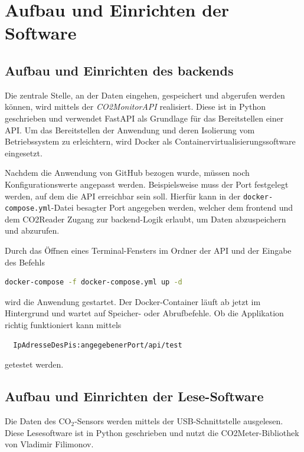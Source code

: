 \documentclass[a4paper,
    12pt,
    headings=small,
    ngerman,
    listof=totoc,
    numbers=noenddot]{scrreprt}[2021/11/13]
\begin{document}
\section{Aufbau und Einrichten der Software}

\subsection{Aufbau und Einrichten des \gls{backend}s}

Die zentrale Stelle, an der Daten eingehen, gespeichert und abgerufen werden können, wird mittels der \textit{CO2MonitorAPI} realisiert. Diese ist in \gls{Python} geschrieben und verwendet FastAPI als Grundlage für das Bereitstellen einer API. Um das Bereitstellen der Anwendung und deren  Isolierung vom Betriebssystem zu erleichtern, wird \gls{Docker} als Containervirtualisierungssoftware eingesetzt.

Nachdem die Anwendung von GitHub bezogen wurde, müssen noch Konfigurationswerte angepasst werden. Beispielsweise muss der Port festgelegt werden, auf dem die \ac{API} erreichbar sein soll. Hierfür kann in der \texttt{docker-compose.yml}-Datei besagter Port angegeben werden, welcher dem \gls{frontend} und dem CO2Reader Zugang zur \gls{backend}-Logik erlaubt, um Daten abzuspeichern und abzurufen.

Durch das Öffnen eines Terminal-Fensters im Ordner der \ac{API} und der Eingabe des Befehls

\begin{lstlisting}[language=Bash]
  docker-compose -f docker-compose.yml up -d
\end{lstlisting}

wird die Anwendung gestartet. Der \gls{Docker}-Container läuft ab jetzt im Hintergrund und wartet auf Speicher- oder Abrufbefehle. Ob die Applikation richtig funktioniert kann mittels

\begin{lstlisting}
  IpAdresseDesPis:angegebenerPort/api/test
\end{lstlisting}

getestet werden.


\subsection{Aufbau und Einrichten der Lese-Software}

Die Daten des CO$_2$-Sensors werden mittels der USB-Schnittstelle ausgelesen. Diese Lesesoftware ist in \gls{Python} geschrieben und nutzt die CO2Meter-Bibliothek von Vladimir Filimonov.
\autocite{github_co2meter}
\end{document}

